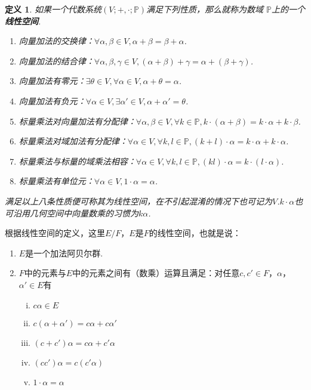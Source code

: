 \documentclass[10pt]{ctexart}
\newtheorem{definition}{定义}
\begin{document}
\begin{definition}
    如果一个代数系统$(V;+,\cdot ; \mathbb{P})$满足下列性质，那么就称为数域 $\mathbb{P}$上的一个\textbf{线性空间}.
    \begin{enumerate}[(1)]
        \item 向量加法的交换律：$\forall \alpha ,\beta \in V, \alpha + \beta = \beta + \alpha$.
        \item 向量加法的结合律：$\forall \alpha, \beta, \gamma \in V,(\alpha + \beta) + \gamma = \alpha + (\beta + \gamma)$.
        \item 向量加法有零元：$\exists \theta \in V, \forall \alpha \in V, \alpha + \theta = \alpha$.
        \item 向量加法有负元：$\forall \alpha \in V, \exists \alpha \prime \in V, \alpha + \alpha \prime = \theta$.
        \item 标量乘法对向量加法有分配律：$\forall \alpha, \beta \in V, \forall k \in \mathbb{P}, k \cdot (\alpha + \beta) = k \cdot \alpha + k \cdot \beta$.
        \item 标量乘法对域加法有分配律：$\forall \alpha \in V, \forall k, l \in \mathbb{P}, (k + l) \cdot \alpha = k \cdot \alpha + k \cdot \alpha$.
        \item 标量乘法与标量的域乘法相容：$\forall \alpha \in V, \forall k, l \in \mathbb{P}, (kl) \cdot \alpha = k \cdot (l \cdot \alpha)$.
        \item 标量乘法有单位元：$\forall \alpha \in V, 1 \cdot \alpha = \alpha$.
    \end{enumerate}
    满足以上八条性质便可称其为线性空间，在不引起混淆的情况下也可记为$V$.$k \cdot \alpha$也可沿用几何空间中向量数乘的习惯为$k \alpha$.
\end{definition}
根据线性空间的定义，这里$E/F$，$E$是$F$的线性空间，也就是说：
\begin{enumerate}[(1)]
    \item $E$是一个加法阿贝尔群.
    \item $F$中的元素与$E$中的元素之间有（数乘）运算且满足：对任意$c,c \prime \in F$，$\alpha$，$ \alpha \prime \in E$有
    \begin{enumerate}[(i)]
        \item $c \alpha \in E$
        \item $c (\alpha + \alpha \prime) = c \alpha + c \alpha \prime$
        \item $(c + c \prime) \alpha = c \alpha + c \prime \alpha$
        \item $(c c \prime) \alpha = c (c \prime \alpha)$
        \item $1 \cdot \alpha = \alpha$
    \end{enumerate}
\end{enumerate}
\end{document}

